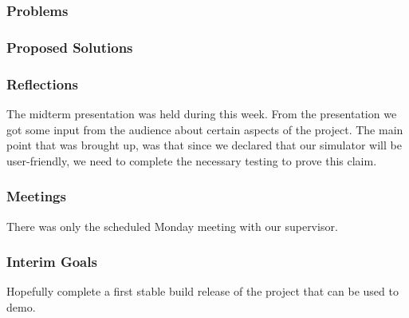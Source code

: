 \subsubsection{Problems}


\subsubsection{Proposed Solutions}


\subsubsection{Reflections}

    The midterm presentation was held during this week. From the presentation we got some input from the audience about certain aspects of the project. The main point that was brought up, was that since we declared that our simulator will be user-friendly, we need to complete the necessary testing to prove this claim.

\subsubsection{Meetings}

    There was only the scheduled Monday meeting with our supervisor.

\subsubsection{Interim Goals}

    Hopefully complete a first stable build release of the project that can be used to demo.


